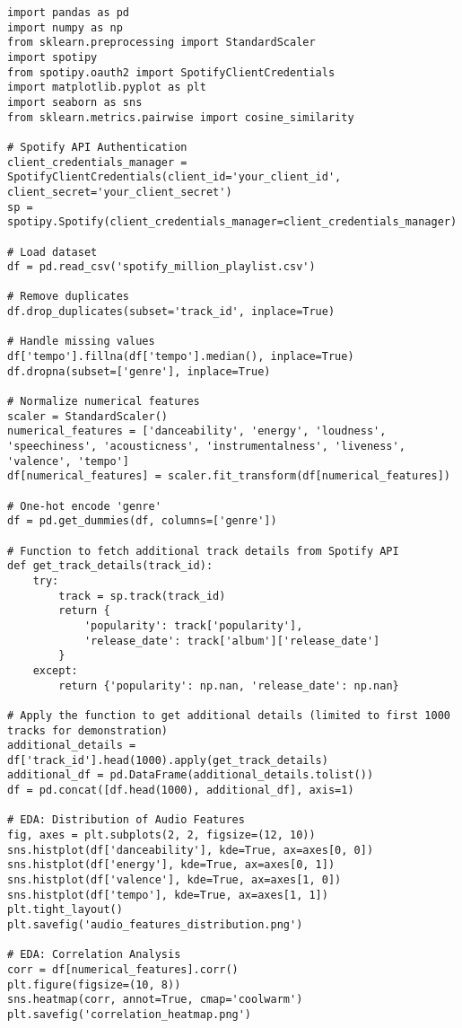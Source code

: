\documentclass[runningheads]{llncs}
\begin{document}
\begin{verbatim}
import pandas as pd
import numpy as np
from sklearn.preprocessing import StandardScaler
import spotipy
from spotipy.oauth2 import SpotifyClientCredentials
import matplotlib.pyplot as plt
import seaborn as sns
from sklearn.metrics.pairwise import cosine_similarity

# Spotify API Authentication
client_credentials_manager = SpotifyClientCredentials(client_id='your_client_id', client_secret='your_client_secret')
sp = spotipy.Spotify(client_credentials_manager=client_credentials_manager)

# Load dataset
df = pd.read_csv('spotify_million_playlist.csv')

# Remove duplicates
df.drop_duplicates(subset='track_id', inplace=True)

# Handle missing values
df['tempo'].fillna(df['tempo'].median(), inplace=True)
df.dropna(subset=['genre'], inplace=True)

# Normalize numerical features
scaler = StandardScaler()
numerical_features = ['danceability', 'energy', 'loudness', 'speechiness', 'acousticness', 'instrumentalness', 'liveness', 'valence', 'tempo']
df[numerical_features] = scaler.fit_transform(df[numerical_features])

# One-hot encode 'genre'
df = pd.get_dummies(df, columns=['genre'])

# Function to fetch additional track details from Spotify API
def get_track_details(track_id):
    try:
        track = sp.track(track_id)
        return {
            'popularity': track['popularity'],
            'release_date': track['album']['release_date']
        }
    except:
        return {'popularity': np.nan, 'release_date': np.nan}

# Apply the function to get additional details (limited to first 1000 tracks for demonstration)
additional_details = df['track_id'].head(1000).apply(get_track_details)
additional_df = pd.DataFrame(additional_details.tolist())
df = pd.concat([df.head(1000), additional_df], axis=1)

# EDA: Distribution of Audio Features
fig, axes = plt.subplots(2, 2, figsize=(12, 10))
sns.histplot(df['danceability'], kde=True, ax=axes[0, 0])
sns.histplot(df['energy'], kde=True, ax=axes[0, 1])
sns.histplot(df['valence'], kde=True, ax=axes[1, 0])
sns.histplot(df['tempo'], kde=True, ax=axes[1, 1])
plt.tight_layout()
plt.savefig('audio_features_distribution.png')

# EDA: Correlation Analysis
corr = df[numerical_features].corr()
plt.figure(figsize=(10, 8))
sns.heatmap(corr, annot=True, cmap='coolwarm')
plt.savefig('correlation_heatmap.png')


\end{verbatim}
\end{document}
